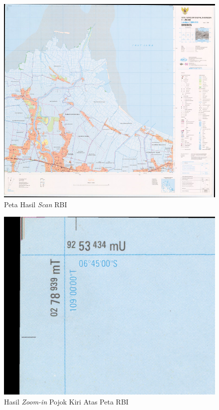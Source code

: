 \begin{enumerate}[1.]
  \begin{figure}[H]
    \centering
    \includegraphics[width=1\textwidth]{./resources/030-rbi-brebes-resize-small}
    \caption{Peta Hasil \textit{Scan} RBI}
    \label{fig:rbismall}
  \end{figure}
  
  \begin{figure}[H]
    \centering
    \includegraphics[width=1\textwidth]{./resources/031-rbi-brebes-crop-grid}
    \caption{Hasil \textit{Zoom-in} Pojok Kiri Atas Peta RBI}
    \label{fig:rbigrid}
  \end{figure}
  

\end{enumerate}
